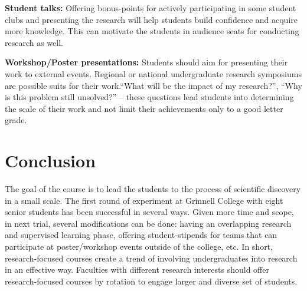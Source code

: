 \documentclass{article}
\begin{document}
\par {\bf Student talks: } Offering bonus-points for actively participating in some student clubs and presenting the research will help students build confidence and acquire more knowledge. This can motivate the students in audience seats for conducting research as well.

\par {\bf Workshop/Poster presentations: } Students should aim for presenting their work to external events. Regional or national undergraduate research symposiums are possible suits for their work.``What will be the impact of my research?'', ``Why is this problem still unsolved?'' -- these questions lead students into determining the scale of their work and not limit their achievements only to a good letter grade.



\section{Conclusion}
\label{concl}
The goal of the course is to lead the students to the process of scientific discovery in a small scale. The first round of experiment at Grinnell College with eight senior students has been successful in several ways. Given more time and scope, in next trial, several modifications can be done: having an overlapping research and supervised learning phase, offering student-stipends for teams that can participate at poster/workshop events outside of the college, etc. In short, research-focused courses create a trend of involving undergraduates into research in an effective way. Faculties with different research interests should offer research-focused courses by rotation to engage larger and diverse set of students. 


\appendix
\end{document}
